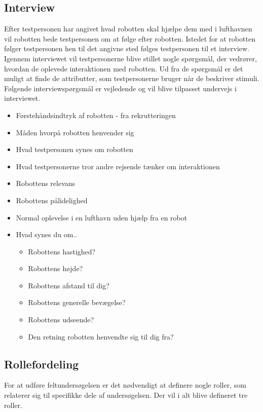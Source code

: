 \subsection*{Interview}
\label{Interview}
%
Efter testpersonen har angivet hvad robotten skal hjælpe dem med i lufthavnen vil robotten bede testpersonen om at følge efter robotten. Istedet for at robotten følger testpersonen hen til det angivne sted følges testpersonen til et interview. Igennem interviewet vil testpersonerne blive stillet nogle spørgsmål, der vedrører, hvordan de oplevede interaktionen med robotten. Ud fra de spørgsmål er det muligt at finde de attributter, som testpersonerne bruger når de beskriver stimuli. Følgende interviewspørgsmål er vejledende og vil blive tilpasset undervejs i interviewet. \blankline 
%
\begin{itemize}
\item Førstehåndsindtryk af robotten - fra rekrutteringen
\item Måden hvorpå robotten henvender sig
\item Hvad testpersonen synes om robotten
\item Hvad testpersonerne tror andre rejsende tænker om interaktionen 
\item Robottens relevans
\item Robottens pålidelighed
\item Normal oplevelse i en lufthavn uden hjælp fra en robot 
\item Hvad synes du om..
	\begin{itemize}
		\item Robottens hastighed?
		\item Robottens højde?
		\item Robottens afstand til dig?
		\item Robottens generelle bevægelse?
		\item Robottens udseende?
		\item Den retning robotten henvendte sig til dig fra?
	\end{itemize}
\end{itemize}
% 

\subsection*{Rollefordeling}
\label{Rollefordeling}
%
For at udføre feltundersøgelsen er det nødvendigt at definere nogle roller, som relaterer sig til specifikke dele af undersøgelsen. Der vil i alt blive defineret tre roller.
%
